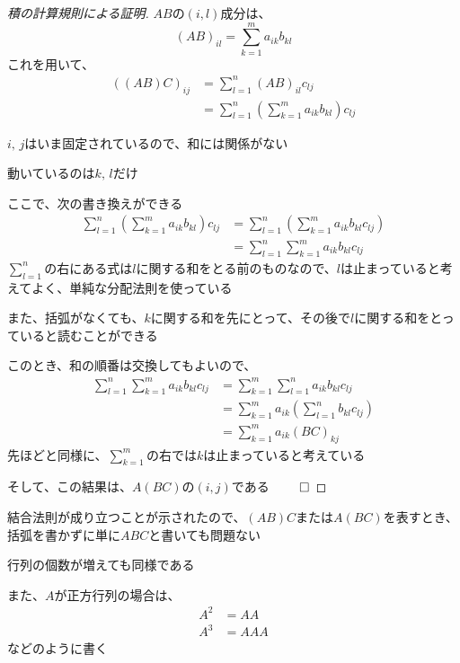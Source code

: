 \documentclass[../../../topic_linear-map]{subfiles}
\begin{document}
\begin{proof}[積の計算規則による証明]
  $AB$の$(i,l)$成分は、
  \begin{equation*}
    (AB)_{il} = \sum_{k=1}^m a_{ik} b_{kl}
  \end{equation*}
  これを用いて、
  \begin{align*}
    ((AB)C)_{ij} & = \sum_{l=1}^n (AB)_{il} c_{lj}                                 \\
                 & = \sum_{l=1}^n \left( \sum_{k=1}^m a_{ik} b_{kl} \right) c_{lj}
  \end{align*}

  $i,\,j$はいま固定されているので、和には関係がない

  動いているのは$k,\,l$だけ

  \br

  ここで、次の書き換えができる
  \begin{align*}
    \sum_{l=1}^n \left( \sum_{k=1}^m a_{ik} b_{kl} \right) c_{lj} & = \sum_{l=1}^n \left(\sum_{k=1}^m a_{ik} b_{kl} c_{lj} \right) \\
                                                                  & = \sum_{l=1}^n \sum_{k=1}^m a_{ik} b_{kl} c_{lj}
  \end{align*}
  $\displaystyle\sum_{l=1}^n$の右にある式は$l$に関する和をとる前のものなので、$l$は止まっていると考えてよく、単純な分配法則を使っている

  また、括弧がなくても、$k$に関する和を先にとって、その後で$l$に関する和をとっていると読むことができる

  \br

  このとき、和の順番は交換してもよいので、
  \begin{align*}
    \sum_{l=1}^n \sum_{k=1}^m a_{ik} b_{kl} c_{lj} & = \sum_{k=1}^m \sum_{l=1}^n a_{ik} b_{kl} c_{lj}                \\
                                                   & = \sum_{k=1}^m a_{ik} \left( \sum_{l=1}^n b_{kl} c_{lj} \right) \\
                                                   & = \sum_{k=1}^m a_{ik} (BC)_{kj}
  \end{align*}
  先ほどと同様に、$\displaystyle\sum_{k=1}^m$の右では$k$は止まっていると考えている

  そして、この結果は、$A(BC)$の$(i, j)$である $\qed$
\end{proof}

結合法則が成り立つことが示されたので、$(AB)C$または$A(BC)$を表すとき、括弧を書かずに単に$ABC$と書いても問題ない

行列の個数が増えても同様である

\br

また、$A$が正方行列の場合は、
\begin{align*}
  A^2 & = AA  \\
  A^3 & = AAA
\end{align*}
などのように書く
\end{document}
